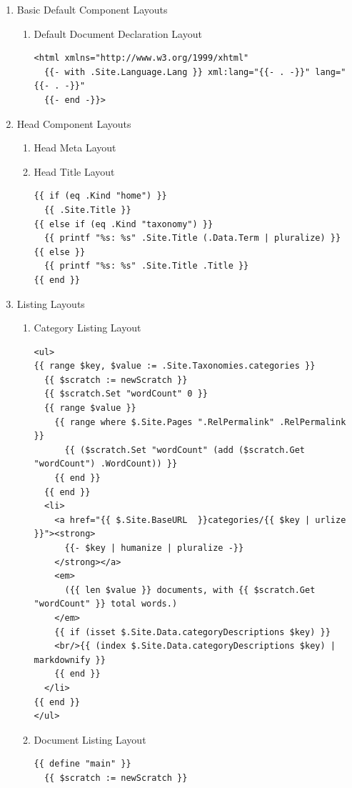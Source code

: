 \documentclass[11pt]{article}
\begin{document}
\begin{enumerate}
\item Basic Default Component Layouts
\label{sec:org78db052}
\begin{enumerate}
\item Default Document Declaration Layout
\label{sec:orgde63e76}
\begin{verbatim}
<html xmlns="http://www.w3.org/1999/xhtml"
  {{- with .Site.Language.Lang }} xml:lang="{{- . -}}" lang="{{- . -}}"
  {{- end -}}>
\end{verbatim}
\end{enumerate}
\item Head Component Layouts
\label{sec:org4bf46ef}
\begin{enumerate}
\item Head Meta Layout
\label{sec:org6748ac3}
\item Head Title Layout
\label{sec:org590ed71}
\begin{verbatim}
{{ if (eq .Kind "home") }}
  {{ .Site.Title }}
{{ else if (eq .Kind "taxonomy") }}
  {{ printf "%s: %s" .Site.Title (.Data.Term | pluralize) }}
{{ else }}
  {{ printf "%s: %s" .Site.Title .Title }}
{{ end }}
\end{verbatim}
\end{enumerate}
\item Listing Layouts
\label{sec:org0fc9a00}
\begin{enumerate}
\item Category Listing Layout
\label{sec:org64d8b3f}
\begin{verbatim}
<ul>
{{ range $key, $value := .Site.Taxonomies.categories }}
  {{ $scratch := newScratch }}
  {{ $scratch.Set "wordCount" 0 }}
  {{ range $value }}
    {{ range where $.Site.Pages ".RelPermalink" .RelPermalink }}
      {{ ($scratch.Set "wordCount" (add ($scratch.Get "wordCount") .WordCount)) }}
    {{ end }}
  {{ end }}
  <li>
    <a href="{{ $.Site.BaseURL  }}categories/{{ $key | urlize  }}"><strong>
      {{- $key | humanize | pluralize -}}
    </strong></a>
    <em>
      ({{ len $value }} documents, with {{ $scratch.Get "wordCount" }} total words.)
    </em>
    {{ if (isset $.Site.Data.categoryDescriptions $key) }}
	<br/>{{ (index $.Site.Data.categoryDescriptions $key) | markdownify }}
    {{ end }}
  </li>
{{ end }}
</ul>
\end{verbatim}
\item Document Listing Layout
\label{sec:org6556104}
\begin{verbatim}
{{ define "main" }}
  {{ $scratch := newScratch }}

\end{verbatim}
\end{enumerate}
\end{enumerate}
\end{document}
